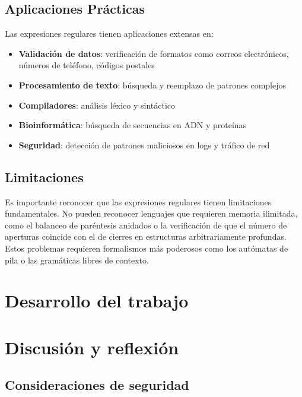 \documentclass[10pt,letterpaper]{article}
\begin{document}
\subsection{Aplicaciones Prácticas}

Las expresiones regulares tienen aplicaciones extensas en:

\begin{itemize}
    \item \textbf{Validación de datos}: verificación de formatos como correos electrónicos, números de teléfono, códigos postales
    \item \textbf{Procesamiento de texto}: búsqueda y reemplazo de patrones complejos
    \item \textbf{Compiladores}: análisis léxico y sintáctico
    \item \textbf{Bioinformática}: búsqueda de secuencias en ADN y proteínas
    \item \textbf{Seguridad}: detección de patrones maliciosos en logs y tráfico de red
\end{itemize}

\subsection{Limitaciones}

Es importante reconocer que las expresiones regulares tienen limitaciones fundamentales. No pueden reconocer lenguajes que requieren memoria ilimitada, como el balanceo de paréntesis anidados o la verificación de que el número de aperturas coincide con el de cierres en estructuras arbitrariamente profundas. Estos problemas requieren formalismos más poderosos como los autómatas de pila o las gramáticas libres de contexto.

\section{Desarrollo del trabajo}

\section{Discusión y reflexión}

\subsection{Consideraciones de seguridad}
\end{document}
